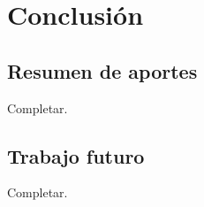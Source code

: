 \chapter{Conclusi\'on}\label{conclussions}

\section{Resumen de aportes}

Completar.

\section{Trabajo futuro}


Completar.